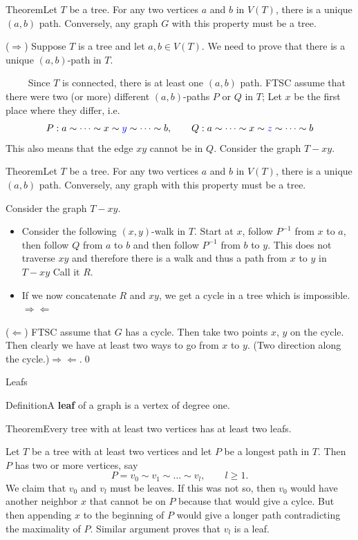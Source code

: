 \documentclass{beamer}
\def\bl[#1]#2{\begin{block}{#1}#2\end{block}}
\def\itemb{\begin{itemize}}
\def\iteme{\end{itemize}}
\begin{document}
\begin{frame}
\bl[Theorem]{Let $T$ be a tree. For any two vertices $a$ and $b$ in $V(T)$, there is a unique $(a,b)$ path. Conversely, any graph $G$ with this property must be  a tree.}
($\Rightarrow$) Suppose $T$ is a tree and let $a,b\in V(T)$. We need to prove that there is a unique $(a,b)$-path in $T$.

~~~~ Since $T$ is connected, there is at least one $(a,b)$ path. FTSC assume that there were two (or more) different $(a,b)$-paths $P$ or $Q$ in $T$; Let $x$ be the first place where they differ, i.e.
\[
P: a\sim\dots\sim x\sim\textcolor{blue}{y}\sim\dots\sim b,\qquad Q: a\sim \dots\sim x\sim\textcolor{blue}{z}\sim\dots\sim b
\]
This also means that the edge $xy$ cannot be in $Q$. Consider the graph $T-xy$.
\end{frame}

\begin{frame}
\bl[Theorem]{Let $T$ be a tree. For any two vertices $a$ and $b$ in $V(T)$, there is a unique $(a,b)$ path. Conversely, any graph with this property must be  a tree.}
Consider the graph $T-xy$.
\itemb
\item Consider the following $(x,y)$-walk in $T$. Start at $x$, follow $P^{-1}$ from $x$ to $a$, then follow $Q$ from $a$ to $b$ and then follow $P^{-1}$ from $b$ to $y$. This does not traverse $xy$ and therefore there is a walk and thus a path from $x$ to $y$ in $T-xy$ Call it $R$.
\item If we now concatenate $R$ and $xy$, we get a cycle in a tree which is impossible. $\Rightarrow\Leftarrow$
\iteme
($\Leftarrow$) FTSC assume that $G$ has a cycle. Then take two points $x$, $y$ on the cycle. Then clearly we have at least two ways to go from $x$ to $y$. (Two direction along the cycle.)$\Rightarrow\Leftarrow$.\qed

\end{frame}

\begin{frame}{Leafs}
\bl[Definition]{A \textbf{leaf} of a graph is a vertex of degree one.}
\bl[Theorem]{Every tree with at least two vertices has at least two leafs.}
Let $T$ be a tree with at least two vertices and let $P$ be a longest path in $T$. Then $P$ has two or more vertices, say
\[
P=v_0\sim v_1\sim\dots\sim v_l,\qquad l\geq 1.
\]
We claim that $v_0$ and $v_l$ must be leaves. If this was not so, then $v_0$ would have another neighbor $x$ that cannot be on $P$ because that would give a cylce. But then appending $x$ to the beginning of $P$ would give a longer path contradicting the maximality of $P$. Similar argument proves that $v_l$ is a leaf.
\end{frame}
\end{document}
